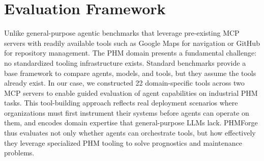 \documentclass[sigconf, screen, nonacm]{acmart}
\begin{document}
\section{Evaluation Framework}   
Unlike general-purpose agentic benchmarks that leverage pre-existing MCP servers with readily available tools such as Google Maps for navigation or GitHub for repository management. The PHM domain presents a fundamental challenge: no standardized tooling infrastructure exists.                                                                 
  Standard benchmarks provide a base framework to compare agents, models, and tools, but   
  they                                                                                     
  assume the tools already exist. In our case, we constructed 22 domain-specific tools     
  across                                                                                   
  two MCP servers to enable guided evaluation of agent capabilities on industrial PHM      
  tasks.                                                                                   
  This tool-building approach reflects real deployment scenarios where organizations must  
  first                                                                                    
  instrument their systems before agents can operate on them, and encodes domain expertise 
  that general-purpose LLMs lack. PHMForge thus evaluates not only whether agents can      
  orchestrate tools, but how effectively they leverage specialized PHM tooling to solve    
  prognostics and maintenance problems.                                                    
                                                                                           
\end{document}
